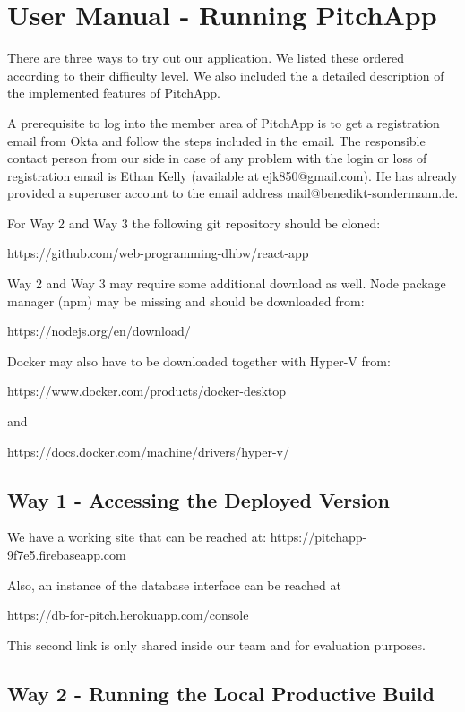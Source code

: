 \chapter{User Manual - Running PitchApp}


There are three ways to try out our application. We listed these ordered according to their difficulty level. We also included the a detailed description of the implemented features of PitchApp.

A prerequisite to log into the member area of PitchApp is to get a registration email from Okta and follow the steps included in the email. The responsible contact person from our side in case of any problem with the login or loss of registration email is Ethan Kelly (available at ejk850@gmail.com). He has already provided a superuser account to the email address mail@benedikt-sondermann.de.

For Way 2 and Way 3 the following git repository should be cloned:

https://github.com/web-programming-dhbw/react-app

Way 2 and Way 3 may require some additional download as well.
Node package manager (npm) may be missing and should be downloaded from:

https://nodejs.org/en/download/

Docker may also have to be downloaded together with Hyper-V from:

https://www.docker.com/products/docker-desktop

and

https://docs.docker.com/machine/drivers/hyper-v/

\section{Way 1 - Accessing the Deployed Version}

We have a working site that can be reached at: https://pitchapp-9f7e5.firebaseapp.com

Also, an instance of the database interface can be reached at

https://db-for-pitch.herokuapp.com/console

This second link is only shared inside our team and for evaluation purposes.

\section{Way 2 - Running the Local Productive Build}


